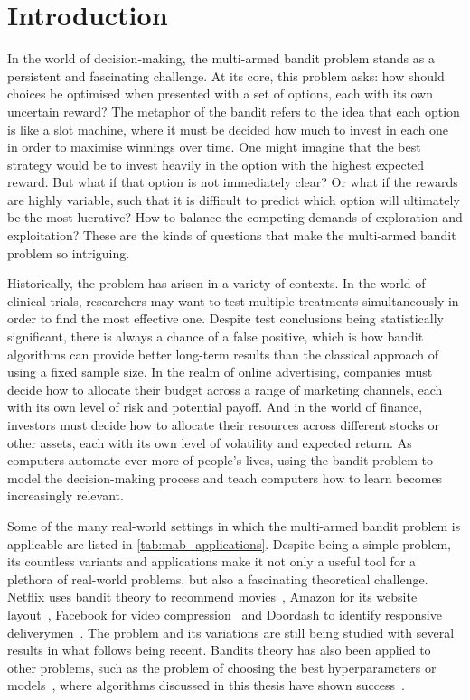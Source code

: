 \chapter{Introduction}
In the world of decision-making, the multi-armed bandit problem stands as a persistent and fascinating challenge.
At its core, this problem asks: how should choices be optimised when presented with a set of options, each with its own uncertain reward?
The metaphor of the bandit refers to the idea that each option is like a slot machine, where it must be decided how much to invest in each one in order to maximise winnings over time.
One might imagine that the best strategy would be to invest heavily in the option with the highest expected reward.
But what if that option is not immediately clear?
Or what if the rewards are highly variable, such that it is difficult to predict which option will ultimately be the most lucrative?
How to balance the competing demands of exploration and exploitation?
These are the kinds of questions that make the multi-armed bandit problem so intriguing.

Historically, the problem has arisen in a variety of contexts.
In the world of clinical trials, researchers may want to test multiple treatments simultaneously in order to find the most effective one.
Despite test conclusions being statistically significant, there is always a chance of a false positive, which is how bandit algorithms can provide better long-term results than the classical approach of using a fixed sample size.
In the realm of online advertising, companies must decide how to allocate their budget across a range of marketing channels, each with its own level of risk and potential payoff.
And in the world of finance, investors must decide how to allocate their resources across different stocks or other assets, each with its own level of volatility and expected return.
As computers automate ever more of people's lives, using the bandit problem to model the decision-making process and teach computers how to learn becomes increasingly relevant.

Some of the many real-world settings in which the multi-armed bandit problem is applicable are listed in \cref{tab:mab_applications}.
Despite being a simple problem, its countless variants and applications make it not only a useful tool for a plethora of real-world problems, but also a fascinating theoretical challenge.
Netflix uses bandit theory to recommend movies~\autocite{kawale2018}, Amazon for its website layout~\autocite{hill2017}, Facebook for video compression~\autocite{daulton2019} and Doordash to identify responsive deliverymen~\autocite{sharma2022}.
The problem and its variations are still being studied with several results in what follows being recent.
Bandits theory has also been applied to other problems, such as the problem of choosing the best hyperparameters or models~\autocite{gagliolo2010}, where algorithms discussed in this thesis have shown success~\autocite{wang2014,bouneffouf2017}.

